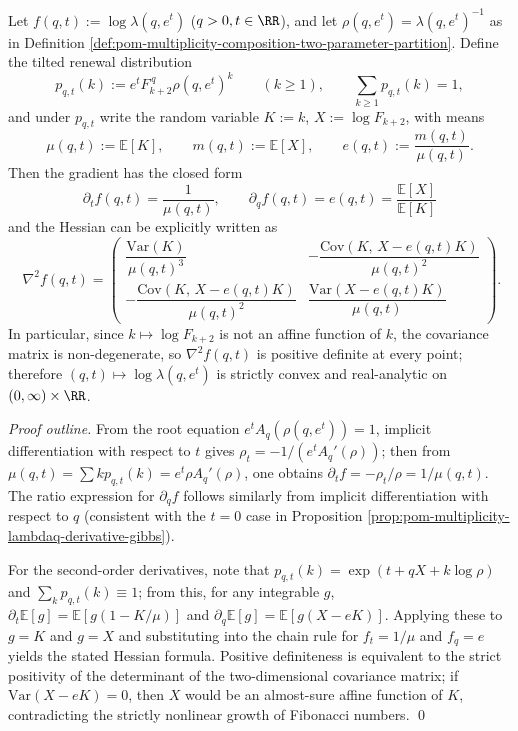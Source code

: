 \begin{proposition}\label{prop:pom-multiplicity-composition-two-parameter-hessian-pd}
Let \(f(q,t):=\log\lambda(q,e^t)\) (\(q>0,t\in\RR\)), and let \(\rho(q,e^t)=\lambda(q,e^t)^{-1}\) as in Definition \ref{def:pom-multiplicity-composition-two-parameter-partition}.
Define the tilted renewal distribution
\[
p_{q,t}(k):=e^t F_{k+2}^{\,q}\rho(q,e^t)^{k}\qquad(k\ge 1),
\qquad \sum_{k\ge 1}p_{q,t}(k)=1,
\]
and under \(p_{q,t}\) write the random variable \(K:=k\), \(X:=\log F_{k+2}\), with means
\[
\mu(q,t):=\mathbb{E}[K],\qquad m(q,t):=\mathbb{E}[X],\qquad e(q,t):=\frac{m(q,t)}{\mu(q,t)}.
\]
Then the gradient has the closed form
\[
\boxed{\;
\partial_t f(q,t)=\frac{1}{\mu(q,t)},\qquad
\partial_q f(q,t)=e(q,t)=\frac{\mathbb{E}[X]}{\mathbb{E}[K]}\;}
\]
and the Hessian can be explicitly written as
\[
\boxed{\;
\nabla^2 f(q,t)=
\begin{pmatrix}
\dfrac{\mathrm{Var}(K)}{\mu(q,t)^3} & -\dfrac{\mathrm{Cov}(K,\,X-e(q,t)K)}{\mu(q,t)^2}\\[1.2ex]
-\dfrac{\mathrm{Cov}(K,\,X-e(q,t)K)}{\mu(q,t)^2} & \dfrac{\mathrm{Var}(X-e(q,t)K)}{\mu(q,t)}
\end{pmatrix}.}
\]
In particular, since \(k\mapsto \log F_{k+2}\) is not an affine function of \(k\), the covariance matrix is non-degenerate, so \(\nabla^2 f(q,t)\) is positive definite at every point; therefore \((q,t)\mapsto \log\lambda(q,e^t)\) is strictly convex and real-analytic on \((0,\infty)\times\RR\).
\end{proposition}
\begin{proof}[Proof outline]
From the root equation \(e^tA_q(\rho(q,e^t))=1\), implicit differentiation with respect to \(t\) gives
\(
\rho_t=-1/(e^tA_q'(\rho))
\);
then from \(\mu(q,t)=\sum k p_{q,t}(k)=e^t\rho A_q'(\rho)\), one obtains \(\partial_t f=-\rho_t/\rho=1/\mu(q,t)\).
The ratio expression for \(\partial_q f\) follows similarly from implicit differentiation with respect to \(q\) (consistent with the \(t=0\) case in Proposition \ref{prop:pom-multiplicity-lambdaq-derivative-gibbs}).
\par
For the second-order derivatives, note that \(p_{q,t}(k)=\exp(t+qX+k\log\rho)\) and \(\sum_k p_{q,t}(k)\equiv 1\);
from this, for any integrable \(g\), \(\partial_t\mathbb{E}[g]=\mathbb{E}[g(1-K/\mu)]\) and \(\partial_q\mathbb{E}[g]=\mathbb{E}[g(X-eK)]\).
Applying these to \(g=K\) and \(g=X\) and substituting into the chain rule for \(f_t=1/\mu\) and \(f_q=e\) yields the stated Hessian formula.
Positive definiteness is equivalent to the strict positivity of the determinant of the two-dimensional covariance matrix; if \(\mathrm{Var}(X-eK)=0\), then \(X\) would be an almost-sure affine function of \(K\), contradicting the strictly nonlinear growth of Fibonacci numbers. \qed
\end{proof}

